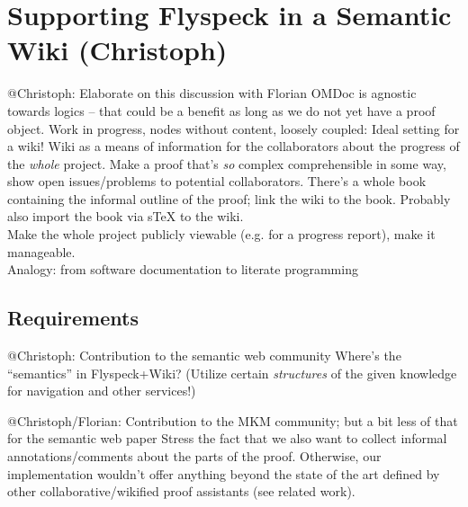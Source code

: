 \documentclass{llncs}
\begin{document}
\section{Supporting Flyspeck in a Semantic Wiki (Christoph)}

\begin{todo}{@Christoph: Elaborate on this discussion with Florian}
  OMDoc is agnostic towards logics -- that could be a benefit as long as we do not yet
  have a proof object. Work in progress, nodes without content, loosely coupled: Ideal
  setting for a wiki!  Wiki as a means of information for the collaborators about the
  progress of the \emph{whole} project.  Make a proof that's \emph{so} complex
  comprehensible in some way, show open issues/problems to potential collaborators.
  There's a whole book containing the informal outline of the proof; link the wiki to the
  book.  Probably also import the book via sTeX to the wiki.\\
  Make the whole project publicly viewable (e.g. for a progress report), make it
  manageable.\\
  Analogy: from software documentation to literate programming
\end{todo}

\subsection{Requirements}
\label{sec:req}


\begin{todo}{@Christoph: Contribution to the semantic web community}
  Where's the ``semantics'' in Flyspeck+Wiki? (Utilize certain \emph{structures} of the
  given knowledge for navigation and other services!)
\end{todo}

\begin{todo}{@Christoph/Florian: Contribution to the MKM community; but a bit less of that
    for the semantic web paper}
  Stress the fact that we also want to collect informal annotations/comments about the
  parts of the proof.  Otherwise, our implementation wouldn't offer anything beyond the
  state of the art defined by other collaborative/wikified proof assistants (see related
  work).
\end{todo}
\end{document}
